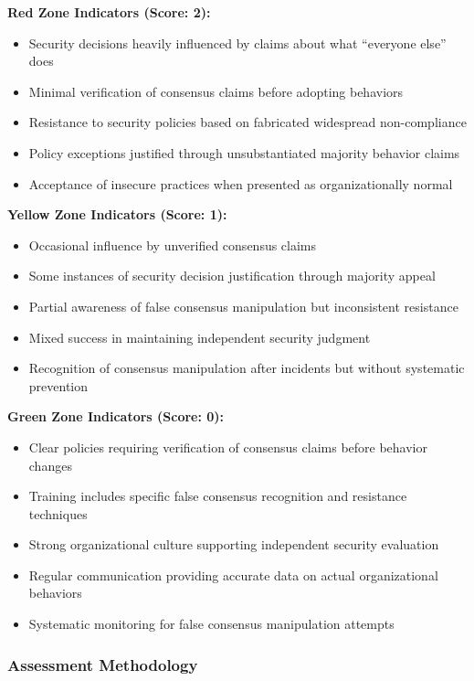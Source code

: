 \documentclass[11pt,a4paper]{article}
\begin{document}
\textbf{Red Zone Indicators (Score: 2):}
\begin{itemize}
\item Security decisions heavily influenced by claims about what ``everyone else'' does
\item Minimal verification of consensus claims before adopting behaviors
\item Resistance to security policies based on fabricated widespread non-compliance
\item Policy exceptions justified through unsubstantiated majority behavior claims
\item Acceptance of insecure practices when presented as organizationally normal
\end{itemize}

\textbf{Yellow Zone Indicators (Score: 1):}
\begin{itemize}
\item Occasional influence by unverified consensus claims
\item Some instances of security decision justification through majority appeal
\item Partial awareness of false consensus manipulation but inconsistent resistance
\item Mixed success in maintaining independent security judgment
\item Recognition of consensus manipulation after incidents but without systematic prevention
\end{itemize}

\textbf{Green Zone Indicators (Score: 0):}
\begin{itemize}
\item Clear policies requiring verification of consensus claims before behavior changes
\item Training includes specific false consensus recognition and resistance techniques
\item Strong organizational culture supporting independent security evaluation
\item Regular communication providing accurate data on actual organizational behaviors
\item Systematic monitoring for false consensus manipulation attempts
\end{itemize}

\subsubsection{Assessment Methodology}
\end{document}
